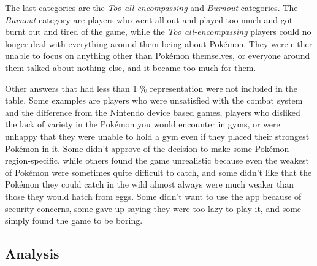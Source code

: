 The last categories are the \emph{Too all-encompassing} and \emph{Burnout} categories. The \emph{Burnout} category are players who went all-out and played too much and got burnt out and tired of the game, while the \emph{Too all-encompassing} players could no longer deal with everything around them being about Pokémon. They were either unable to focus on anything other than Pokémon themselves, or everyone around them talked about nothing else, and it became too much for them.

Other answers that had less than 1 \% representation were not included in the table. Some examples are players who were unsatisfied with the combat system and the difference from the Nintendo device based games, players who disliked the lack of variety in the Pokémon you would encounter in gyms, or were unhappy that they were unable to hold a gym even if they placed their strongest Pokémon in it. Some didn't approve of the decision to make some Pokémon region-specific, while others found the game unrealistic because even the weakest of Pokémon were sometimes quite difficult to catch, and some didn't like that the Pokémon they could catch in the wild almost always were much weaker than those they would hatch from eggs. Some didn't want to use the app because of security concerns, some gave up saying they were too lazy to play it, and some simply found the game to be boring.

\subsection{Analysis}
\label{sec:success-factors-quitting-analysis}






